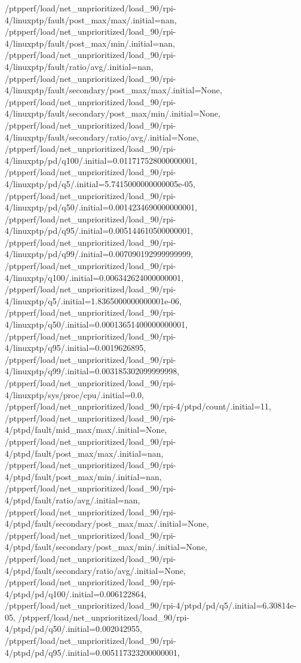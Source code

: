 {    /ptpperf/load/net_unprioritized/load_90/rpi-4/linuxptp/fault/post_max/max/.initial=nan,
    /ptpperf/load/net_unprioritized/load_90/rpi-4/linuxptp/fault/post_max/min/.initial=nan,
    /ptpperf/load/net_unprioritized/load_90/rpi-4/linuxptp/fault/ratio/avg/.initial=nan,
    /ptpperf/load/net_unprioritized/load_90/rpi-4/linuxptp/fault/secondary/post_max/max/.initial=None,
    /ptpperf/load/net_unprioritized/load_90/rpi-4/linuxptp/fault/secondary/post_max/min/.initial=None,
    /ptpperf/load/net_unprioritized/load_90/rpi-4/linuxptp/fault/secondary/ratio/avg/.initial=None,
    /ptpperf/load/net_unprioritized/load_90/rpi-4/linuxptp/pd/q100/.initial=0.011717528000000001,
    /ptpperf/load/net_unprioritized/load_90/rpi-4/linuxptp/pd/q5/.initial=5.7415000000000005e-05,
    /ptpperf/load/net_unprioritized/load_90/rpi-4/linuxptp/pd/q50/.initial=0.0014234690000000001,
    /ptpperf/load/net_unprioritized/load_90/rpi-4/linuxptp/pd/q95/.initial=0.005144610500000001,
    /ptpperf/load/net_unprioritized/load_90/rpi-4/linuxptp/pd/q99/.initial=0.007090192999999999,
    /ptpperf/load/net_unprioritized/load_90/rpi-4/linuxptp/q100/.initial=0.006342624000000001,
    /ptpperf/load/net_unprioritized/load_90/rpi-4/linuxptp/q5/.initial=1.8365000000000001e-06,
    /ptpperf/load/net_unprioritized/load_90/rpi-4/linuxptp/q50/.initial=0.00013651400000000001,
    /ptpperf/load/net_unprioritized/load_90/rpi-4/linuxptp/q95/.initial=0.0019626895,
    /ptpperf/load/net_unprioritized/load_90/rpi-4/linuxptp/q99/.initial=0.003185302099999998,
    /ptpperf/load/net_unprioritized/load_90/rpi-4/linuxptp/sys/proc/cpu/.initial=0.0,
    /ptpperf/load/net_unprioritized/load_90/rpi-4/ptpd/count/.initial=11,
    /ptpperf/load/net_unprioritized/load_90/rpi-4/ptpd/fault/mid_max/max/.initial=None,
    /ptpperf/load/net_unprioritized/load_90/rpi-4/ptpd/fault/post_max/max/.initial=nan,
    /ptpperf/load/net_unprioritized/load_90/rpi-4/ptpd/fault/post_max/min/.initial=nan,
    /ptpperf/load/net_unprioritized/load_90/rpi-4/ptpd/fault/ratio/avg/.initial=nan,
    /ptpperf/load/net_unprioritized/load_90/rpi-4/ptpd/fault/secondary/post_max/max/.initial=None,
    /ptpperf/load/net_unprioritized/load_90/rpi-4/ptpd/fault/secondary/post_max/min/.initial=None,
    /ptpperf/load/net_unprioritized/load_90/rpi-4/ptpd/fault/secondary/ratio/avg/.initial=None,
    /ptpperf/load/net_unprioritized/load_90/rpi-4/ptpd/pd/q100/.initial=0.006122864,
    /ptpperf/load/net_unprioritized/load_90/rpi-4/ptpd/pd/q5/.initial=6.30814e-05,
    /ptpperf/load/net_unprioritized/load_90/rpi-4/ptpd/pd/q50/.initial=0.002042955,
    /ptpperf/load/net_unprioritized/load_90/rpi-4/ptpd/pd/q95/.initial=0.005117323200000001,
}
